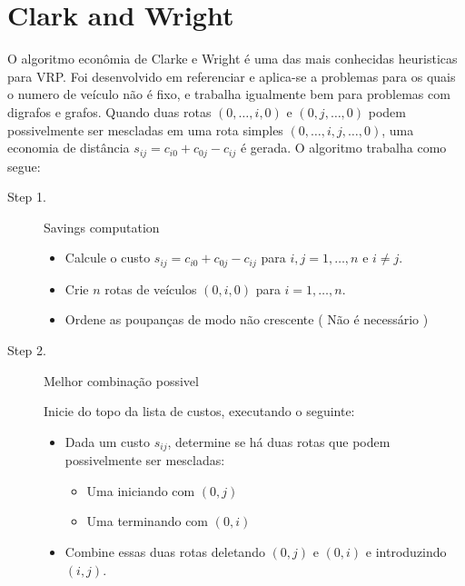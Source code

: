 \section{Clark and Wright}

 O algoritmo econômia de Clarke e Wright é uma das mais conhecidas heuristicas para VRP. Foi
desenvolvido em {\color{red} referenciar} e aplica-se a problemas para os quais o numero de veículo
não é fixo, e trabalha igualmente bem para problemas com digrafos e grafos. Quando duas rotas
$(0,\ldots, i, 0)$ e $(0,j,\ldots,0)$ podem possivelmente ser mescladas em uma rota simples
$(0,\ldots,i,j,\ldots,0)$, uma economia de distância $s_{ij}=c_{i0}+c_{0j}-c_{ij}$ é gerada. O
algoritmo trabalha como segue:

\begin{description}
\item[Step 1.] Savings computation

\begin{itemize}
\item Calcule o custo $s_{ij} = c_{i0}+c_{0j}-c_{ij}$ para $i,j=1,\ldots,n$ e $i\neq j$.
\item Crie $n$ rotas de veículos $(0,i,0)$ para $i=1,\ldots,n$.
\item Ordene as poupanças de modo não crescente ( Não é necessário )
\end{itemize}

\item[Step 2.] Melhor combinação possivel

Inicie do topo da lista de custos, executando o seguinte:

\begin{itemize}
\item Dada um custo $s_{ij}$, determine se há duas rotas que podem possivelmente ser mescladas:

\begin{itemize}
\item Uma iniciando com $(0,j)$
\item Uma terminando com $(0,i)$
\end{itemize}

\item Combine essas duas rotas deletando $(0,j)$ e $(0,i)$ e introduzindo $(i,j)$.
\end{itemize}
%

\end{description}

